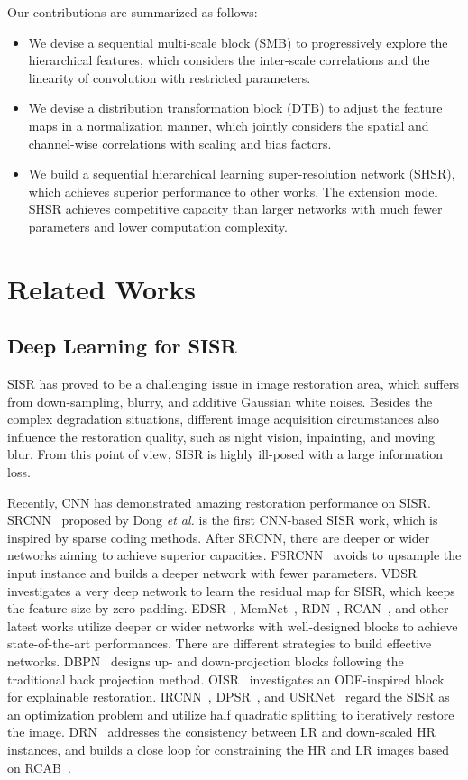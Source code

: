 \documentclass[manuscript,screen]{acmart}
\begin{document}
Our contributions are summarized as follows:
\begin{itemize}
	\item
	We devise a sequential multi-scale block (SMB) to progressively explore the hierarchical features, which considers the inter-scale correlations and the linearity of convolution with restricted parameters.
	\item
	We devise a distribution transformation block (DTB) to adjust the feature maps in a normalization manner, which jointly considers the spatial and channel-wise correlations with scaling and bias factors.
	\item
We build a sequential hierarchical learning super-resolution network (SHSR), which achieves superior performance to other works. The extension model SHSR achieves competitive capacity than larger networks with much fewer parameters and lower computation complexity.
\end{itemize}

\section{Related Works}
\subsection{Deep Learning for SISR} 
SISR has proved to be a challenging issue in image restoration area, which suffers from down-sampling, blurry, and additive Gaussian white noises. Besides the complex degradation situations, different image acquisition circumstances also influence the restoration quality, such as night vision, inpainting, and moving blur. From this point of view, SISR is highly ill-posed with a large information loss.

Recently, CNN has demonstrated amazing restoration performance on SISR. SRCNN~\cite{srcnn_pami2016} proposed by Dong \textit{et al.} is the first CNN-based SISR work, which is inspired by sparse coding methods. After SRCNN, there are deeper or wider networks aiming to achieve superior capacities. FSRCNN~\cite{fsrcnn_eccv2016} avoids to upsample the input instance and builds a deeper network with fewer parameters. VDSR~\cite{vdsr_cvpr2016} investigates a very deep network to learn the residual map for SISR, which keeps the feature size by zero-padding. EDSR~\cite{edsr_cvpr2017}, MemNet~\cite{memnet_iccv2017}, RDN~\cite{rdn_pami2020}, RCAN~\cite{rcan_eccv2018}, and other latest works utilize deeper or wider networks with well-designed blocks to achieve state-of-the-art performances. There are different strategies to build effective networks. DBPN~\cite{dbpn_pami2020} designs up- and down-projection blocks following the traditional back projection method. OISR~\cite{oisr_cvpr2019} investigates an ODE-inspired block for explainable restoration. IRCNN~\cite{ircnn_cvpr2017}, DPSR~\cite{dpsr_cvpr2019}, and USRNet~\cite{usrnet_cvpr2020} regard the SISR as an optimization problem and utilize half quadratic splitting to iteratively restore the image. DRN~\cite{drn_cvpr2020} addresses the consistency between LR and down-scaled HR instances, and builds a close loop for constraining the HR and LR images based on RCAB~\cite{rcan_eccv2018}.
\end{document}
